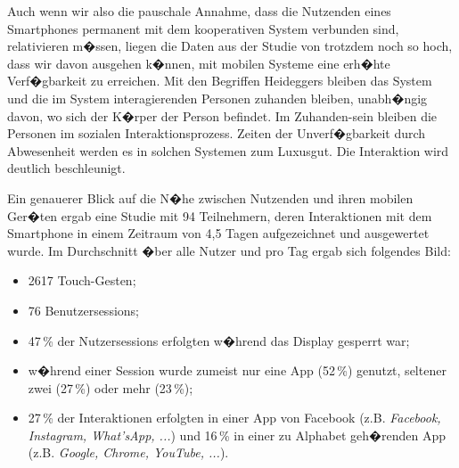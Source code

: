 Auch wenn wir also die pauschale Annahme, dass die Nutzenden eines Smartphones permanent mit dem kooperativen System verbunden sind, relativieren m�ssen, liegen die Daten aus der Studie von \cite{Winnick2016} trotzdem noch so hoch, dass wir davon ausgehen k�nnen, mit mobilen Systeme eine erh�hte Verf�gbarkeit zu erreichen. Mit den Begriffen Heideggers bleiben das System und die im System interagierenden Personen  zuhanden bleiben, unabh�ngig davon, wo sich der K�rper der Person befindet. Im Zuhanden-sein bleiben die Personen im sozialen Interaktionsprozess. Zeiten der Unverf�gbarkeit durch Abwesenheit werden es in solchen Systemen zum Luxusgut. Die Interaktion wird deutlich beschleunigt.

\begin{comment}
\cite{Czerwinski2016}
Competing for attention will become an increasing concern as we move towards an IoT environment where more and more devices in varied contexts will compete for our attention.


yyy Benutzer nicht �berfordern und zu Handlungen verleiten, die ihn Unterbrechen. 

Nudging 

Ziel: how do we time and contextualize notifications so as to optimize for minimal disruption of the user's attention while
\end{comment}
Ein genauerer Blick auf die N�he zwischen Nutzenden und ihren mobilen Ger�ten ergab eine Studie mit 94 Teilnehmern, deren Interaktionen mit dem Smartphone in einem Zeitraum von 4,5 Tagen aufgezeichnet und ausgewertet wurde. Im Durchschnitt �ber alle Nutzer und pro Tag ergab sich folgendes Bild:
\begin{itemize}
	\item 2617 Touch-Gesten; 
	\item 76 Benutzersessions;
	\item 47\,\% der Nutzersessions erfolgten w�hrend das Display gesperrt war;
	\item w�hrend einer Session wurde zumeist nur eine App (52\,\%) genutzt, seltener zwei (27\,\%) oder mehr (23\,\%);
	\item 27\,\% der Interaktionen erfolgten in einer App von Facebook (z.B. \textit{Facebook, Instagram, What'sApp, ...}) und 16\,\% in einer zu Alphabet geh�renden App (z.B. \textit{Google, Chrome, YouTube, ...}).
\end{itemize}


